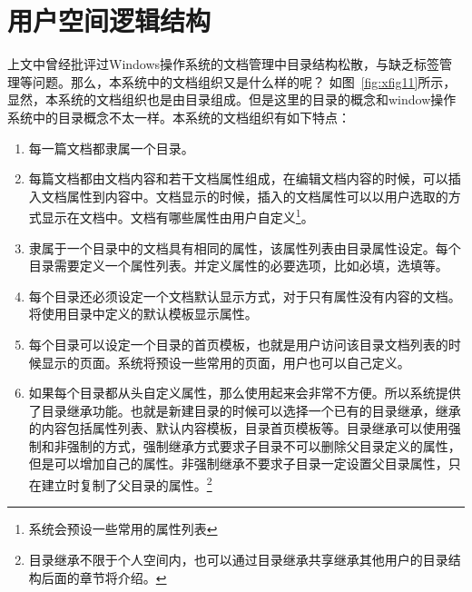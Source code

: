 \section{用户空间逻辑结构}
\label{sec:personstructure}

上文中曾经批评过Windows操作系统的文档管理中目录结构松散，与缺乏标签管理等问题。那么，本系统中的文档组织又是什么样的呢？ 如图~\ref{fig:xfig11}所示，显然，本系统的文档组织也是由目录组成。但是这里的目录的概念和window操作系统中的目录概念不太一样。本系统的文档组织有如下特点：
\begin{enumerate}
\item 每一篇文档都隶属一个目录。
\item 每篇文档都由文档内容和若干文档属性组成，在编辑文档内容的时候，可以插入文档属性到内容中。文档显示的时候，插入的文档属性可以以用户选取的方式显示在文档中。文档有哪些属性由用户自定义\footnote{系统会预设一些常用的属性列表}。
\item 隶属于一个目录中的文档具有相同的属性，该属性列表由目录属性设定。每个目录需要定义一个属性列表。并定义属性的必要选项，比如必填，选填等。
\item 每个目录还必须设定一个文档默认显示方式，对于只有属性没有内容的文档。将使用目录中定义的默认模板显示属性。
\item 每个目录可以设定一个目录的首页模板，也就是用户访问该目录文档列表的时候显示的页面。系统将预设一些常用的页面，用户也可以自己定义。
\item 如果每个目录都从头自定义属性，那么使用起来会非常不方便。所以系统提供了目录继承功能。也就是新建目录的时候可以选择一个已有的目录继承，继承的内容包括属性列表、默认内容模板，目录首页模板等。目录继承可以使用强制和非强制的方式，强制继承方式要求子目录不可以删除父目录定义的属性，但是可以增加自己的属性。非强制继承不要求子目录一定设置父目录属性，只在建立时复制了父目录的属性。\footnote{目录继承不限于个人空间内，也可以通过目录继承共享继承其他用户的目录结构后面的章节将介绍。}
\end{enumerate}

